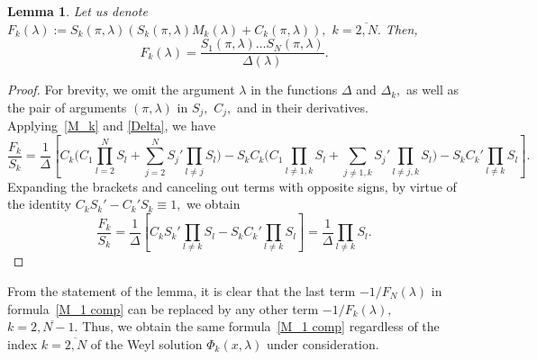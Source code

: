 \documentclass[a4paper, 12pt] {article}
\theoremstyle{plain}
\newtheorem{lemma}{\indent Lemma}
\theoremstyle{remark}
\theoremstyle{plain}
\theoremstyle{definition}
\numberwithin{equation}{section}
\begin{document}
\begin{lemma} Let us denote $F_k(\lambda) := S_k(\pi, \lambda)(S_k(\pi, \lambda)M_k(\lambda) + C_k(\pi, \lambda)),$ $k=\overline{2, N}.$ Then,
\begin{equation} \label{F_k}
F_k(\lambda) = \frac{S_1(\pi, \lambda) \ldots S_N(\pi, \lambda)}{\Delta(\lambda)}.
\end{equation}
\end{lemma}
\begin{proof}
For brevity, we omit the argument  $\lambda$ in the functions $\Delta$ and $\Delta_k,$ as well as the pair of arguments $(\pi, \lambda)$ in $S_j,$ $C_j,$ and in their derivatives.
Applying~\eqref{M_k} and \eqref{Delta}, we have
\begin{equation*}
\frac{F_k}{S_k} = \frac{1}{\Delta}\left[ C_k \Big(C_1 \prod_{l=2}^N S_l + \sum_{j=2}^N S_j' \prod_{l \ne j} S_l\Big) - S_k C_k \Big(C_1 \prod_{l\ne 1, k} S_l + \sum_{j\ne1,k} S_j' \prod_{l\ne j,k} S_l\Big) - S_k C_k' \prod_{l\ne k}S_l\right].
\end{equation*}
Expanding the brackets and canceling out terms with opposite signs, by virtue of the identity $C_k S_k' - C_k'S_k \equiv 1,$ we obtain
$$
\frac{F_k}{ S_k} = \frac{1}{\Delta}\left[C_k S_k' \prod_{l \ne k} S_l - S_k C_k' \prod_{l\ne k}S_l\right] = \frac{1}{\Delta} \prod_{l \ne k} S_l.
$$
\end{proof}
From the statement of the lemma, it is clear that the last term $-1/F_N(\lambda)$ in formula~\eqref{M_1 comp} can be replaced by any other term $-1/F_k(\lambda),$ $k=\overline{2, N-1}.$ Thus, we obtain the same formula~\eqref{M_1 comp} regardless of the index $k=\overline{2, N}$ of the Weyl solution $\Phi_k(x, \lambda)$ under consideration.
\end{document}
